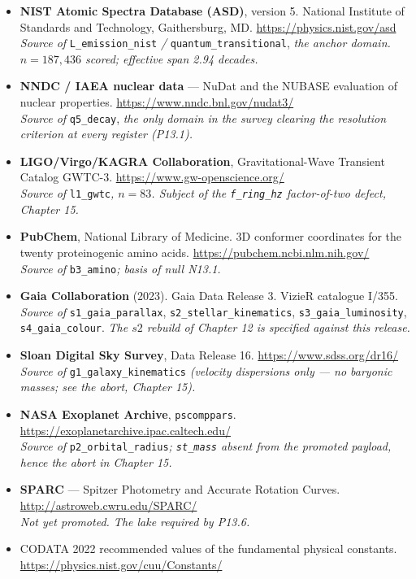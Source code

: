 \documentclass[11pt, letterpaper, openany]{book}
\begin{document}
\begin{itemize}
    \item \textbf{NIST Atomic Spectra Database (ASD)}, version 5. National Institute of
          Standards and Technology, Gaithersburg, MD. \url{https://physics.nist.gov/asd}
          \\ \textit{Source of} \texttt{L\_emission\_nist} \textit{/}
          \texttt{quantum\_transitional}, \textit{the anchor domain. $n = 187{,}436$ scored;
          effective span 2.94 decades.}
    \item \textbf{NNDC / IAEA nuclear data} --- NuDat and the NUBASE evaluation of nuclear
          properties. \url{https://www.nndc.bnl.gov/nudat3/}
          \\ \textit{Source of} \texttt{q5\_decay}, \textit{the only domain in the survey
          clearing the resolution criterion at every register (P13.1).}
    \item \textbf{LIGO/Virgo/KAGRA Collaboration}, Gravitational-Wave Transient Catalog
          GWTC-3. \url{https://www.gw-openscience.org/}
          \\ \textit{Source of} \texttt{l1\_gwtc}\textit{, $n = 83$. Subject of the
          \texttt{f\_ring\_hz} factor-of-two defect, Chapter 15.}
    \item \textbf{PubChem}, National Library of Medicine. 3D conformer coordinates for the
          twenty proteinogenic amino acids. \url{https://pubchem.ncbi.nlm.nih.gov/}
          \\ \textit{Source of} \texttt{b3\_amino}\textit{; basis of null N13.1.}
    \item \textbf{Gaia Collaboration} (2023). Gaia Data Release 3. VizieR catalogue I/355.
          \\ \textit{Source of} \texttt{s1\_gaia\_parallax}, \texttt{s2\_stellar\_kinematics},
          \texttt{s3\_gaia\_luminosity}, \texttt{s4\_gaia\_colour}.
          \textit{The $s2$ rebuild of Chapter 12 is specified against this release.}
    \item \textbf{Sloan Digital Sky Survey}, Data Release 16. \url{https://www.sdss.org/dr16/}
          \\ \textit{Source of} \texttt{g1\_galaxy\_kinematics} \textit{(velocity dispersions
          only --- no baryonic masses; see the abort, Chapter 15).}
    \item \textbf{NASA Exoplanet Archive}, \texttt{pscomppars}.
          \url{https://exoplanetarchive.ipac.caltech.edu/}
          \\ \textit{Source of} \texttt{p2\_orbital\_radius}\textit{; \texttt{st\_mass} absent
          from the promoted payload, hence the abort in Chapter 15.}
    \item \textbf{SPARC} --- Spitzer Photometry and Accurate Rotation Curves.
          \url{http://astroweb.cwru.edu/SPARC/}
          \\ \textit{Not yet promoted. The lake required by P13.6.}
    \item CODATA 2022 recommended values of the fundamental physical constants.
          \url{https://physics.nist.gov/cuu/Constants/}
\end{itemize}
\end{document}
